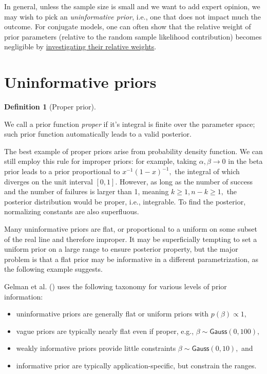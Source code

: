 \documentclass[
  11pt,
  letterpaper,
]{scrbook}
\providecommand{\tightlist}{%
  \setlength{\itemsep}{0pt}\setlength{\parskip}{0pt}}\usepackage{longtable,booktabs,array}
\theoremstyle{definition}
\newtheorem{definition}{Definition}[chapter]
\theoremstyle{plain}
\theoremstyle{plain}
\theoremstyle{definition}
\theoremstyle{definition}
\theoremstyle{remark}
\begin{document}
In general, unless the sample size is small and we want to add expert
opinion, we may wish to pick an \emph{uninformative prior}, i.e., one
that does not impact much the outcome. For conjugate models, one can
often show that the relative weight of prior parameters (relative to the
random sample likelihood contribution) becomes negligible by
\href{https://en.wikipedia.org/wiki/Conjugate_prior}{investigating their
relative weights}.

\section{Uninformative priors}\label{uninformative-priors}

\begin{definition}[Proper
prior]\protect\hypertarget{def-properprior}{}\label{def-properprior}

We call a prior function \emph{proper} if it's integral is finite over
the parameter space; such prior function automatically leads to a valid
posterior.

\end{definition}

The best example of proper priors arise from probability density
function. We can still employ this rule for improper priors: for
example, taking \(\alpha, \beta \to 0\) in the beta prior leads to a
prior proportional to \(x^{-1}(1-x)^{-1},\) the integral of which
diverges on the unit interval \([0,1].\) However, as long as the number
of success and the number of failures is larger than 1, meaning
\(k \geq 1, n-k \geq 1,\) the posterior distribution would be proper,
i.e., integrable. To find the posterior, normalizing constants are also
superfluous.

Many uninformative priors are flat, or proportional to a uniform on some
subset of the real line and therefore improper. It may be superficially
tempting to set a uniform prior on a large range to ensure posterior
property, but the major problem is that a flat prior may be informative
in a different parametrization, as the following example suggests.

Gelman et al. () uses the following
taxonomy for various levels of prior information:

\begin{itemize}
\tightlist
\item
  uninformative priors are generally flat or uniform priors with
  \(p(\beta) \propto 1,\)
\item
  vague priors are typically nearly flat even if proper, e.g.,
  \(\beta \sim \mathsf{Gauss}(0, 100),\)
\item
  weakly informative priors provide little constraints
  \(\beta \sim \mathsf{Gauss}(0, 10),\) and
\item
  informative prior are typically application-specific, but constrain
  the ranges.
\end{itemize}
\end{document}
